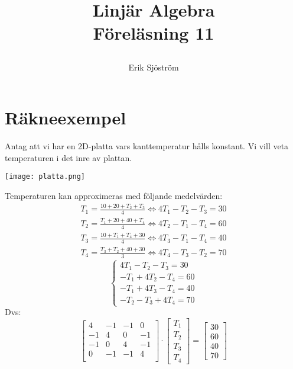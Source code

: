 

\title{
	 Linjär Algebra\\
	 Föreläsning 11
    \author{Erik Sjöström}
}

\maketitle
\section{Räkneexempel} %
\label{sec:r_kneexempel}
Antag att vi har en 2D-platta vars kanttemperatur hålls konstant. Vi vill veta temperaturen i det inre av plattan.
\begin{center}
	\texttt{[image: platta.png]}
\end{center}
Temperaturen kan approximeras med följande medelvärden:
\begin{gather*}
	T_1 = \frac{10 + 20 + T_2 + T_3}{4} \Leftrightarrow 4T_1 - T_2 - T_3 = 30\\
	T_2 = \frac{T_1 + 20 + 40 + T_4}{4} \Leftrightarrow 4T_2 - T_1 - T_4 = 60\\
	T_3 = \frac{10 + T_1 + T_4 + 30}{4} \Leftrightarrow 4T_3 - T_1 - T_4 = 40\\
	T_4 = \frac{T_3 + T_2 + 40 + 30}{3} \Leftrightarrow 4T_4 - T_3 - T_2 = 70
\end{gather*}
\[
    \begin{cases}
    	4T_1 - T_2 - T_3 = 30\\
    	-T_1 + 4T_2 - T_4 = 60\\
    	-T_1 + 4T_3 - T_4 = 40 \\
    	-T_2 -T_3 + 4T_4 = 70
    \end{cases}
\]
Dvs:
\[
    \begin{bmatrix} 
    4 & -1 & -1 & 0\\
    -1 & 4 & 0 & -1\\
    -1 & 0 & 4 & -1\\
    0 & -1 & -1 & 4\\
    \end{bmatrix}
    \cdot \begin{bmatrix} T_1\\T_2\\T_3\\T_4 \end{bmatrix} = \begin{bmatrix} 30\\60\\40\\70 \end{bmatrix}
\]
